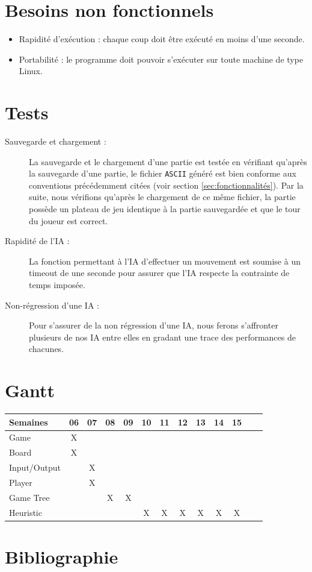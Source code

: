 \documentclass[10pt,a4paper]{article}
\begin{document}
\section{Besoins non fonctionnels}
\label{sec:besoins_non_fonctionnels}
\begin{itemize} 
\item Rapidité d'exécution : chaque coup doit être exécuté en moins d'une seconde.
\item Portabilité : le programme doit pouvoir s'exécuter sur toute machine de type Linux.
\end{itemize}

\section{Tests}
\label{sec:tests}

\begin{description}
\item [Sauvegarde et chargement :] La sauvegarde et le chargement d'une partie est testée en vérifiant qu'après la sauvegarde d'une partie, le fichier \verb!ASCII! généré est bien conforme aux conventions précédemment citées (voir section \ref{sec:fonctionnalités}). Par la suite, nous vérifions qu'après le chargement de ce même fichier, la partie possède un plateau de jeu identique à la partie sauvegardée et que le tour du joueur est correct.
\item [Rapidité de l'IA :] La fonction permettant à l'IA d'effectuer un mouvement est soumise à un timeout de une seconde pour assurer que l'IA respecte la contrainte de temps imposée.
\item [Non-régression d'une IA :] Pour s'assurer de la non régression d'une IA, nous ferons s'affronter plusieurs de nos IA entre elles en gradant une trace des performances de chacunes.
\end{description}


\section{Gantt}

\begin{center}
\begin{tabular}{| l | c | c | c | c | c | c | c | c | c | c | c | c |}
\hline
Semaines     & 06 & 07 & 08 & 09 & 10 & 11 & 12 & 13 & 14 & 15  \\ \hline
Game         & X  &    &    &    &    &    &    &    &    &     \\ \hline
Board        & X  &    &    &    &    &    &    &    &    &     \\ \hline
Input/Output &    & X  &    &    &    &    &    &    &    &     \\ \hline
Player       &    & X  &    &    &    &    &    &    &    &     \\ \hline
Game Tree    &    &    & X  & X  &    &    &    &    &    &     \\ \hline
Heuristic    &    &    &    &    &  X & X  & X  & X  & X  & X   \\ \hline
\end{tabular}
\end{center}
\newpage

\section{Bibliographie}


{}
\nocite{*}
\end{document}
